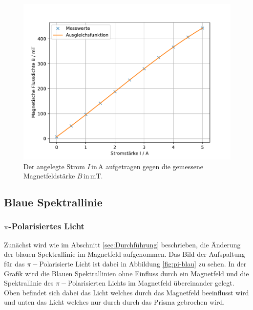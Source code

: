 \begin{figure}
    \centering
    \includegraphics[width=\textwidth]{content/data/magnetfeld.pdf}
    \caption{Der angelegte Strom $I \, \text{in} \, \si{\ampere}$ aufgetragen gegen die gemessene Magnetfeldstärke $B \, \text{in} \, \si{\milli\tesla}$.}
    \label{fig:Magnetfeld}
\end{figure}

\subsection{Blaue Spektrallinie}

\subsubsection{ \texorpdfstring{$\pi$}{\textpi}-Polarisiertes Licht}
Zunächst wird wie im Abschnitt \ref{sec:Durchführung} beschrieben, die Änderung der blauen Spektrallinie im Magnetfeld aufgenommen.
Das Bild der Aufspaltung für das $\pi -$Polarisierte Licht ist dabei in Abbildung \ref{fig:pi-blau} zu sehen.
In der Grafik wird die Blauen Spektrallinien ohne Einfluss durch ein Magnetfeld und die Spektrallinie des $\pi -$Polarisierten Lichts im Magnetfeld übereinander gelegt.
Oben befindet sich dabei das Licht welches durch das Magnetfeld beeinflusst wird und unten das Licht welches nur durch durch das Prisma gebrochen wird.

